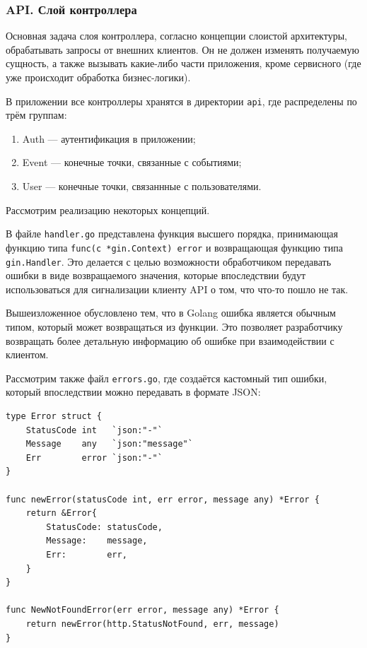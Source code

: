\documentclass[diploma]{SCWorks}
\begin{document}
\subsubsection{API. Слой контроллера}

Основная задача слоя контроллера, согласно концепции слоистой архитектуры,
обрабатывать запросы от внешних клиентов. Он не должен изменять получаемую 
сущность, а также вызывать какие-либо части приложения, кроме сервисного 
(где уже происходит обработка бизнес-логики).

В приложении все контроллеры хранятся в директории \texttt{api}, где 
распределены по трём группам:
\begin{enumerate}
    \item Auth — аутентификация в приложении;
    \item Event — конечные точки, связанные с событиями;
    \item User — конечные точки, связаннные с пользователями.
\end{enumerate}

Рассмотрим реализацию некоторых концепций.

В файле \texttt{handler.go} представлена функция высшего порядка, принимающая
функцию типа \texttt{func(c *gin.Context) error} и возвращающая функцию типа
\texttt{gin.Handler}. Это делается с целью возможности обработчиком передавать
ошибки в виде возвращаемого значения, которые впоследствии будут использоваться
для сигнализации клиенту API о том, что что-то пошло не так.

Вышеизложенное обусловлено тем, что в Golang ошибка является обычным типом,
который может возвращаться из функции. Это позволяет разработчику возвращать 
более детальную информацию об ошибке при взаимодействии с клиентом.

Рассмотрим также файл \texttt{errors.go}, где создаётся кастомный тип ошибки,
который впоследствии можно передавать в формате JSON:

\begin{verbatim}
type Error struct {
    StatusCode int   `json:"-"`
    Message    any   `json:"message"`
    Err        error `json:"-"`
}

func newError(statusCode int, err error, message any) *Error {
    return &Error{
        StatusCode: statusCode,
        Message:    message,
        Err:        err,
    }
}

func NewNotFoundError(err error, message any) *Error {
    return newError(http.StatusNotFound, err, message)
}
\end{verbatim}
\end{document}
